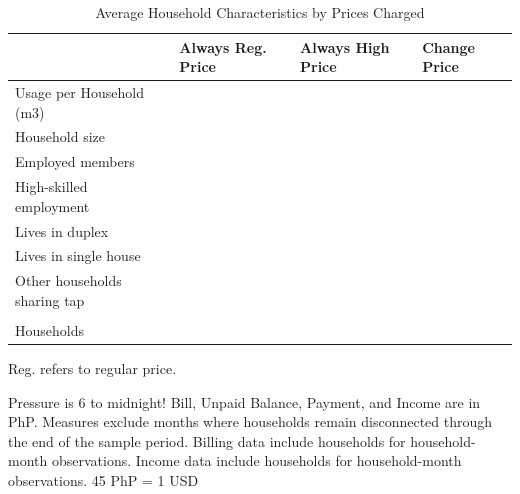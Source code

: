 \documentclass[12pt,table]{article}
\begin{document}
\begin{table}[h!] %
\centering
\caption{Average Household Characteristics by Prices Charged}\label{table:pricechangestatistics}
\vspace{-2mm}
\begin{threeparttable}
\begin{tabular}{@{}l*{1}{KKK}@{}}
\toprule
  & Always Reg. Price & Always High Price  & Change Price \\
\midrule
Usage per Household (m3)&  \\
Household size &  \\
Employed members &  \\
High-skilled employment &  \\
Lives in duplex&  \\
Lives in single house&  \\
Other households sharing tap&  \\
\\[-.5em]
Households &  \\
\bottomrule
\end{tabular}
\begin{tablenotes}
\footnotesize
\item  Reg. refers to regular price.  

Pressure is 6 to midnight! Bill, Unpaid Balance, Payment, and Income are in PhP.  Measures exclude months where households remain disconnected through the end of the sample period.  Billing data include households for household-month observations.  Income data include households for household-month observations.  45 PhP = 1 USD \,\,
\end{tablenotes}
\end{threeparttable}
\end{table}
\end{document}
